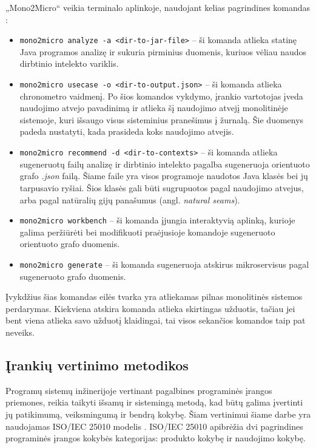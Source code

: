 \documentclass{VUMIFPSbakalaurinis}
\begin{document}
„Mono2Micro“ veikia terminalo aplinkoje, naudojant kelias pagrindines komandas \cite{IBMM2M}:
\begin{itemize}
    \item \verb|mono2micro analyze -a <dir-to-jar-file>| -- ši komanda atlieka statinę Java programos analizę ir sukuria pirminius duomenis, kuriuos vėliau naudos dirbtinio intelekto variklis.

    \item \verb|mono2micro usecase -o <dir-to-output.json>| -- ši komanda atlieka chronometro vaidmenį. Po šios komandos vykdymo, įrankio vartotojas įveda naudojimo atvejo pavadinimą ir atlieka šį naudojimo atvejį monolitinėje sistemoje, kuri išsaugo visus sisteminius pranešimus į žurnalą. Šie duomenys padeda nustatyti, kada prasideda koks naudojimo atvejis.

    \item \verb|mono2micro recommend -d <dir-to-contexts>| -- ši komanda atlieka sugeneruotų failų analizę ir dirbtinio intelekto pagalba sugeneruoja orientuoto grafo \emph{.json} failą. Šiame faile yra visos programoje naudotos Java klasės bei jų tarpusavio ryšiai. Šios klasės gali būti sugrupuotos pagal naudojimo atvejus, arba pagal natūralių gijų panašumus (angl. \emph{natural seams}).

    \item \verb|mono2micro workbench| -- ši komanda įjungia interaktyvią aplinką, kurioje galima peržiūrėti bei modifikuoti praėjusioje komandoje sugeneruoto orientuoto grafo duomenis.

    \item \verb|mono2micro generate| -- ši komanda sugeneruoja atskirus mikroservisus pagal sugeneruoto grafo duomenis.
\end{itemize}

Įvykdžius šias komandas eilės tvarka yra atliekamas pilnas monolitinės sistemos perdarymas. Kiekviena atskira komanda atlieka skirtingas užduotis, tačiau jei bent viena atlieka savo užduotį klaidingai, tai visos sekančios komandos taip pat neveiks. 


\subsection{Įrankių vertinimo metodikos}
  Programų sistemų inžinerijoje vertinant pagalbines programinės įrangos priemones, reikia taikyti išsamų ir sistemingą metodą, kad būtų galima įvertinti jų patikimumą, veiksmingumą ir bendrą kokybę. Šiam vertinimui šiame darbe yra naudojamas ISO/IEC 25010 modelis \cite{iso}. ISO/IEC 25010 apibrėžia dvi pagrindines programinės įrangos kokybės kategorijas: produkto kokybę ir naudojimo kokybę. 
  
\end{document}
